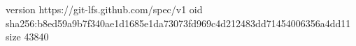 version https://git-lfs.github.com/spec/v1
oid sha256:b8ed59a9b7f340ae1d1685e1da73073fd969c4d212483dd71454006356a4dd11
size 43840
